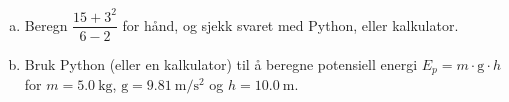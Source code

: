 %
\begin{enumerate}[a)]
    \item Beregn $\dfrac{15 + 3^2}{6 - 2}$ for hånd, og sjekk svaret med Python, eller kalkulator.
    \item Bruk Python (eller en kalkulator) til å beregne potensiell energi $E_p = m \cdot \mathrm{g} \cdot h$ for $m = \SI{5.0}{\kilo\gram}$, $\mathrm{g} = \SI{9.81}{\metre\per\second\squared}$ og $h = \SI{10.0}{\metre}$.
\end{enumerate}

